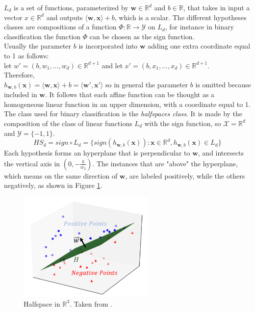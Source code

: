 $L_d$ is a set of functions, parameterized by $\mathbf{w} \in \mathbb{R}^d$ and $b \in \mathbb{R}$, that takes in input a vector $x \in \mathbb{R}^d$ and outputs $\langle \textbf{w},\textbf{x} \rangle + b$, which is a scalar.
The different hypotheses classes are compositions of a function $\Phi : \mathbb{R} \rightarrow \mathcal{Y}$ on $L_d$, for instance in binary classification the function $\Phi$ can be chosen as the sign function.\\
Usually the parameter $b$ is incorporated into $\mathbf{w}$ adding one extra coordinate equal to 1 as follows:\\
let $w'=(b, w_1, \dots , w_d) \in \mathbb{R}^{d+1}$ and let $x'=(b, x_1, \dots , x_d) \in \mathbb{R}^{d+1}$.\\
Therefore, \\
$h_{\mathbf{w},b}(\mathbf{x}) = \langle \mathbf{w},\mathbf{x} \rangle + b = \langle \mathbf{w'},\mathbf{x'} \rangle$
so in general the parameter $b$ is omitted because included in $\mathbf{w}$. It follows that each affine function can be thought as a homogeneous linear function in an upper dimension, with a coordinate equal to 1.\\
The class used for binary classification is the \textit{halfspaces class}. It is made by the composition of the class of linear functions $L_d$ with the sign function, so $\mathcal{X}=\mathbb{R}^d$ and $\mathcal{Y}=\{-1,1\}$.
\[ HS_d = sign \circ L_d = \{ sign( h_{\mathbf{w},b}(\mathbf{x}) ) : \mathbf{x} \in \mathbb{R}^d, h_{\mathbf{w},b}(\mathbf{x}) \in L_d \} \]
Each hypothesis forms an hyperplane that is perpendicular to $\mathbf{w}$, and intersects the vertical axis in $(0, -\frac{b}{w_2})$. The instances that are "above" the hyperplane, which means on the same direction of $\mathbf{w}$, are labeled positively, while the others negatively, as shown in Figure \ref{fig:halfspace}.

\begin{figure}[ht]
	\centering
	\includegraphics[width=0.6\textwidth]{figures/halfspace.png}
	\caption{Halfspace in $\mathbb{R}^3$. Taken from \cite{halfspace}.}
	\label{fig:halfspace}
\end{figure}










